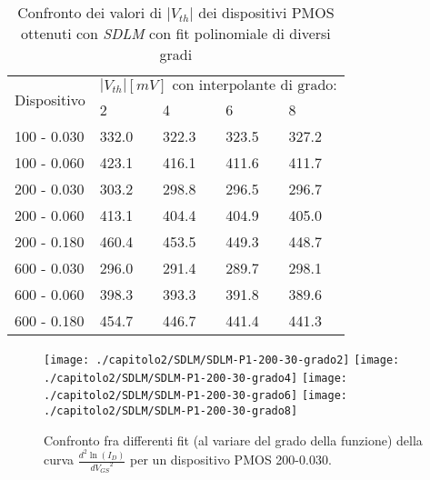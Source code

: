 \begin{table}[h]
  \renewcommand{\arraystretch}{1.3}
  \centering
  \begin{tabular}{m{2.1cm} m{2cm} m{2cm} m{2cm} m{2cm}}
    \toprule
    \multirow{2}{*}{Dispositivo} & \multicolumn{4}{c}{$|V_{th}| [mV] \text{ con interpolante di grado:}$}                         \\
    \cmidrule{2-5}
                                 & 2                                                                    & 4     & 6     & 8     \\
    \midrule
    100 - 0.030                  & 332.0                                                                & 322.3 & 323.5 & 327.2 \\
    \hline
    100 - 0.060                  & 423.1                                                                & 416.1 & 411.6 & 411.7 \\
    \hline
    200 - 0.030                  & 303.2                                                                & 298.8 & 296.5 & 296.7 \\
    \hline
    200 - 0.060                  & 413.1                                                                & 404.4 & 404.9 & 405.0 \\
    \hline
    200 - 0.180                  & 460.4                                                                & 453.5 & 449.3 & 448.7 \\
    \hline
    600 - 0.030                  & 296.0                                                                & 291.4 & 289.7 & 298.1 \\
    \hline
    600 - 0.060                  & 398.3                                                                & 393.3 & 391.8 & 389.6 \\
    \hline
    600 - 0.180                  & 454.7                                                                & 446.7 & 441.4 & 441.3 \\
    \hline
  \end{tabular}
  \caption[Confronto $|V_{th}|$ al variare del grado del fit polinomiale con il metodo SDLM]{Confronto dei valori di $|V_{th}|$ dei dispositivi PMOS ottenuti con \emph{SDLM} con fit polinomiale di diversi gradi}
  \label{tab:GradiSDLM}
\end{table}

\begin{figure}[h!]
  \centering
  \texttt{[image: ./capitolo2/SDLM/SDLM-P1-200-30-grado2]}
  \texttt{[image: ./capitolo2/SDLM/SDLM-P1-200-30-grado4]}
  \texttt{[image: ./capitolo2/SDLM/SDLM-P1-200-30-grado6]}
  \texttt{[image: ./capitolo2/SDLM/SDLM-P1-200-30-grado8]}
  \caption[Confronto SDLM tra diversi fit polinomiali a diversi gradi]{Confronto fra differenti fit (al variare del grado della funzione) della curva $\frac{d^2 \ln(I_D)}{d {V_{GS}}^2}$ per un dispositivo PMOS 200-0.030.}
  \label{fig:GradiSDLM}
\end{figure}


